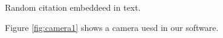
    \newpage
    
    Random citation \cite[p. 2] {bar} embeddeed in text.
    
    Figure \ref{fig:camera1} shows a camera uesd in our software.
    
    
     
    
